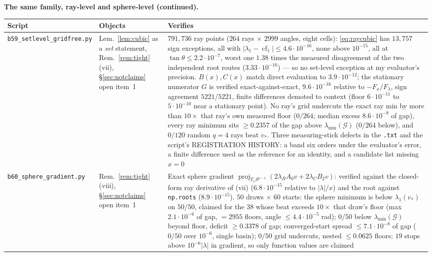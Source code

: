 \documentclass[11pt]{article}
\theoremstyle{remark}
\newcommand{\Gr}{\mathcal{G}}
\begin{document}
\noindent\textbf{The same family, ray-level and sphere-level (continued).}
\begin{center}\footnotesize\begin{tabular}{@{}>{\raggedright\arraybackslash}p{5.1cm}%
>{\raggedright\arraybackslash}p{2.5cm}>{\raggedright\arraybackslash}p{5.8cm}@{}}
\toprule Script & Objects & Verifies\\
\midrule
\texttt{b59\_setlevel\_gridfree.py} & Lem.~\ref{lem:cubic} as a \emph{set} statement,
Rem.~\ref{rem:tight}(vii), \S\ref{sec:notclaims} open item~1 &
$791{,}736$ ray points ($264$ rays $\times$ $2999$ angles, eight cells): \eqref{eq:raycubic} has
$13{,}757$ sign exceptions, all with $|\lambda_1-\operatorname{cf}_1|\le4.6\cdot10^{-16}$, none above
$10^{-15}$, all at $\tan\theta\le2.2\cdot10^{-7}$, worst one $1.38$ times the measured disagreement of
the two independent root routes ($3.33\cdot10^{-16}$) --- so no set-level exception at my evaluator's
precision. $B(x),C(x)$ match direct evaluation to $3.9\cdot10^{-12}$; the
stationary numerator $G$ is verified exact-against-exact, $9.6\cdot10^{-16}$ relative to $-F_x/F_\lambda$,
sign agreement $5221/5221$, finite differences demoted to context (floor $6\cdot10^{-11}$ to
$5\cdot10^{-10}$ near a stationary point). No ray's grid undercuts the exact ray min by more than
$10\times$ that ray's own measured floor ($0/264$; median excess $8.6\cdot10^{-9}$ of gap), every ray
minimum sits $\ge0.2357$ of the gap above $\lambda_{\min}(\Gr)$ ($0/264$ below), and $0/120$ random
$q=4$ rays beat $v_\ast$. Three measuring-stick defects in the \texttt{.txt} and the script's
REGISTRATION HISTORY: a band six orders under the evaluator's error, a finite difference used as the
reference for an identity, and a candidate list missing $x=0$\\
\addlinespace
\texttt{b60\_sphere\_gradient.py} & Rem.~\ref{rem:tight}(viii), \S\ref{sec:notclaims} open item~1 &
Exact sphere gradient $\operatorname{proj}_{T_vS^{p-1}}(2\lambda_B A_0v+2\lambda_C B_2v)$: verified
against the closed-form ray derivative of (vii) ($6.8\cdot10^{-15}$ relative to $|\lambda|/x$) and the
root against \texttt{np.roots} ($8.9\cdot10^{-15}$). $50$ draws $\times$ $60$ starts: the sphere minimum
is below $\lambda_1(v_\ast)$ on $50/50$, claimed for the $38$ whose beat exceeds $10\times$ that draw's
floor (max $2.1\cdot10^{-6}$ of gap, $=2955$ floors, angle $\le4.4\cdot10^{-5}$ rad);
$0/50$ below $\lambda_{\min}(\Gr)$ beyond floor, deficit $\ge0.3378$ of gap; converged-start spread
$\le7.1\cdot10^{-8}$ of gap ($0/50$ over $10^{-6}$, single basin); $0/50$ grid undercuts, nested
$\le0.0625$ floors; $19$ stops above $10^{-6}|\lambda|$ in gradient, so only function values are claimed\\
\bottomrule
\end{tabular}\end{center}
\end{document}
